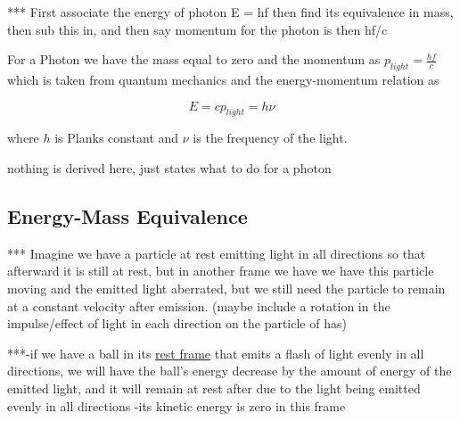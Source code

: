 *** First associate the energy of photon E = hf then find its equivalence in mass, then sub this in, and then say momentum for the photon is then hf/c

For a Photon we have the mass equal to zero and the momentum as $p_{light} = \frac{hf}{c}$ which is taken from quantum mechanics and the energy-momentum relation as

\begin{equation}
	E ={c}p_{light} = h \nu
\end{equation}

where ${h}$ is Planks constant and ${\nu}$ is the frequency of the light.

nothing is derived here, just states what to do for a photon

\subsection{Energy-Mass Equivalence} \label{subsect: Energy-Mass Equivalence}

*** Imagine we have a particle at rest emitting light in all directions so that afterward it is still at rest, but in another frame we have we have this particle moving and the emitted light aberrated, but we still need the particle to remain at a constant velocity after emission.
(maybe include a rotation in the impulse/effect of light in each direction on the particle of has)

***-if we have a ball in its \hyperlink{def-proper-frame}{rest frame} that emits a flash of light evenly in all directions, we will have the ball's energy decrease by the amount of energy of the emitted light, and it will remain at rest after due to the light being emitted evenly in all directions
-its kinetic energy is zero in this frame





